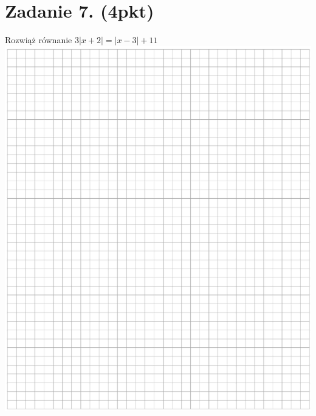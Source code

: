 \documentclass[10pt]{article}
\begin{document}
\section*{Zadanie 7. (4pkt)}
Rozwiąż równanie \(3|x+2|=|x-3|+11\)\\
\includegraphics[max width=\textwidth, center]{2024_11_21_439e1d90cd1e7f928ae2g-05}
\end{document}

